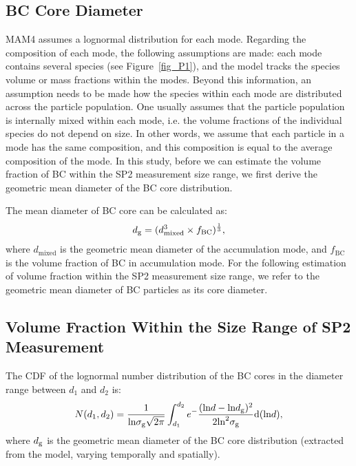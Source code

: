 \documentclass[12pt, fullpage]{uiucthesis2009_2}
\begin{document}
	\subsection{BC Core Diameter} 
	MAM4 assumes a lognormal distribution for each mode. Regarding the composition of each mode, the following assumptions are made: each mode contains several species (see Figure~\ref{fig_P1}), and the model tracks the species volume or mass fractions within the modes. Beyond this information, an assumption needs to be made how the species within each mode are distributed across the particle population. One usually assumes that the particle population is internally mixed within each mode, i.e. the volume fractions of the individual species do not depend on size. In other words, we assume that each particle in a mode has the same composition, and this composition is equal to the average composition of the mode. 
	In this study, before we can estimate the volume fraction of BC within the SP2 measurement size range, we first derive the geometric mean diameter of the BC core distribution. 
	
	The mean diameter of BC core can be calculated as:
	\begin{align*}
	d_{\rm g} = (d_{\text{mixed}}^3 \times f_{\text{BC}})^\frac{1}{3}, 
	\end{align*}
	where $d_{\text{mixed}}$ is the geometric mean diameter of the accumulation mode, and $f_{\text{BC}}$ is the volume
	fraction of BC in accumulation mode. For the following estimation of volume fraction within the SP2 measurement size range, we refer to the geometric mean diameter of BC particles as its core diameter.
	
	\subsection{Volume Fraction Within the Size Range of SP2 Measurement}
	The CDF of the lognormal number distribution of the BC cores in the diameter range between $d_{1}$ and
	$d_{2}$ is:
	\begin{align*}
	N(d_{1}, d_{2}) = \frac{1}{\text{ln}\sigma_{\text{g}}\sqrt{2\pi}}\int_{d_{1}}^{d_{2}}e^-\frac{(\text{ln}d - \text{ln}d_{\rm g})^2}{2\text{ln}^2\sigma_{\text{g}}}\text{d}(\text{ln}d),
	\end{align*}
	where $d_{\rm g}$ is the geometric mean diameter of the BC core distribution (extracted from the model, varying temporally and spatially). 
	
\end{document}
